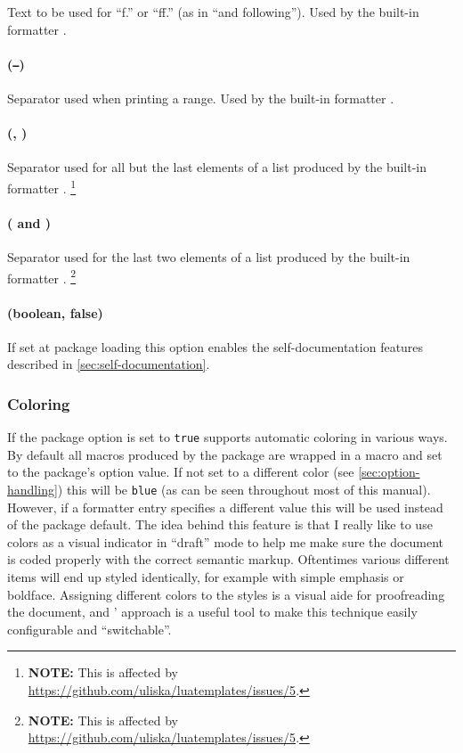 \documentclass{scrartcl}
\begin{document}
Text to be used for “f.” or “ff.” (as in “and following”).  Used by the built-in formatter .


\paragraph{ (\texttt{--})}

Separator used when printing a range.  Used by the built-in formatter .


\paragraph{ (, )}

Separator used for all but the last elements of a list produced by the built-in formatter
.%
\footnote{\textbf{NOTE:} This is affected by
\url{https://github.com/uliska/luatemplates/issues/5}.}


\paragraph{ ( and )}

Separator used for the last two elements of a list produced by the built-in formatter
.%
\footnote{\textbf{NOTE:} This is affected by
\url{https://github.com/uliska/luatemplates/issues/5}.}


\paragraph{ (boolean, false)}

If set at package loading this option enables the self-documentation features
described in \vref{sec:self-documentation}.


\subsubsection{Coloring}
\label{sec:coloring}

If the package option  is set to \texttt{true}
 supports automatic coloring in various ways.  By default
all macros produced by the package are wrapped in a  macro and
set to the package's  option value.  If not set to a
different color (see \vref{sec:option-handling}) this will be \texttt{blue}
(as can be seen throughout most of this manual).  However, if a formatter entry
specifies a different  value this will be used instead of the
package default.  The idea behind this feature is that I really like to use
colors as a visual indicator in “draft” mode to help me make sure the document
is coded properly with the correct semantic markup.  Oftentimes various
different items will end up styled identically, for example with simple emphasis
or boldface.  Assigning different colors to the styles is a visual aide for
proofreading the document, and ' approach is a useful tool
to make this technique easily configurable and “switchable”.
\end{document}
